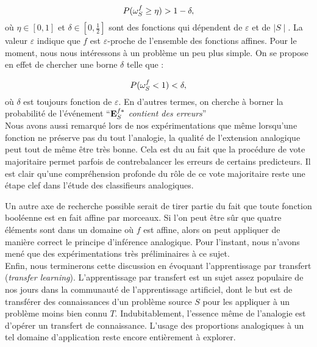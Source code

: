 $$P(\omega_{S}^{f} \geq \eta) > 1 - \delta,$$
où $\eta \in [0, 1]$ et $\delta \in [0, \frac{1}{2}]$ sont des fonctions 
qui dépendent de $\varepsilon$ et de $\mid S \mid$. La valeur $\varepsilon$
indique que $f$ est $\varepsilon$-proche de l'ensemble des fonctions affines.
Pour le moment, nous nous intéressons à un problème un peu plus simple. On se
propose en effet de chercher une borne $\delta$ telle que :

$$P(\omega_{S}^{f} < 1) < \delta,$$
où $\delta$ est toujours fonction de $\varepsilon$.  En d'autres termes, on
cherche à borner la probabilité de l'événement ``\textit{$\mathbf{E}_{S}^{f*}$ contient des
erreurs}''\\


Nous avons aussi remarqué lors de nos expérimentations que même lorsqu'une
fonction ne préserve pas du tout l'analogie, la qualité de l'extension
analogique peut tout de même être très bonne. Cela est du au fait que la
procédure de vote majoritaire permet parfois de contrebalancer les erreurs de
certains predicteurs. Il est clair qu'une compréhension profonde du rôle de ce
vote majoritaire reste une étape clef dans l'étude des classifieurs
analogiques.

Un autre axe de recherche possible serait de tirer partie du fait que toute
fonction booléenne est en fait affine par morceaux. Si l'on peut être sûr que
quatre éléments sont dans un domaine où $f$ est affine, alors on peut appliquer
de manière correct le principe d'inférence analogique. Pour l'instant, nous
n'avons mené que des expérimentations très préliminaires  à ce sujet.\\

Enfin, nous terminerons cette discussion en évoquant l'apprentissage par
transfert (\textit{transfer learning}). L'apprentissage par transfert est un
sujet assez populaire de nos jours dans la communauté de l'apprentissage
artificiel, dont le but est de transférer des connaissances d'un problème
source $S$ pour les appliquer à un problème moins bien connu $T$.
Indubitablement, l'essence même de l'analogie est d'opérer un transfert de
connaissance. L'usage des proportions analogiques à un tel domaine
d'application reste encore entièrement à explorer.
